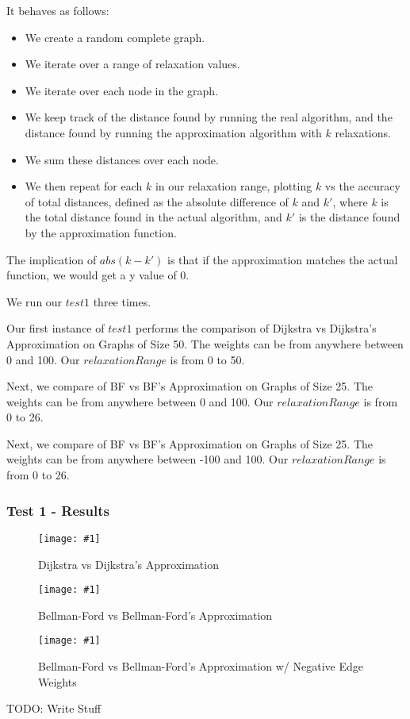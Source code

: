 \documentclass{article}
\newcommand{\figureInsetScaled}[3]
{
    \FloatBarrier{}
    \begin{figure}[ht!]
        \centering
        \texttt{[image: \#1]}
        \caption{#2}
    \end{figure}
    \FloatBarrier{}
}
\begin{document}
It behaves as follows:
\begin{itemize}
    \item We create a random complete graph.
    \item We iterate over a range of relaxation values.
    \item We iterate over each node in the graph.
    \item We keep track of the distance found by running the real algorithm, and the distance found by running the approximation algorithm with $k$ relaxations.
    \item We sum these distances over each node.
    \item We then repeat for each $k$ in our relaxation range, plotting $k$ vs the accuracy of total distances, defined as the absolute difference of $k$ and $k'$, where $k$ is the total distance found in the actual algorithm, and $k'$ is the distance found by the approximation function.
\end{itemize}

The implication of $abs(k - k')$ is that if the approximation matches the actual function, we would get a y value of 0.

We run our $test1$ three times.

Our first instance of $test1$ performs the comparison of Dijkstra vs Dijkstra's Approximation on Graphs of Size 50. The weights can be from anywhere between 0 and 100. Our $relaxationRange$ is from 0 to 50.

Next, we compare of BF vs BF's Approximation on Graphs of Size 25. The weights can be from anywhere between 0 and 100. Our $relaxationRange$ is from 0 to 26.

Next, we compare of BF vs BF's Approximation on Graphs of Size 25. The weights can be from anywhere between -100 and 100. Our $relaxationRange$ is from 0 to 26.

\subsubsection{Test 1 - Results}

\figureInsetScaled{images/part1/exp1_1a.png}{Dijkstra vs Dijkstra's Approximation}{0.5}
\figureInsetScaled{images/part1/exp1_1b.png}{Bellman-Ford vs Bellman-Ford's Approximation}{0.5}
\figureInsetScaled{images/part1/exp1_1c.png}{Bellman-Ford vs Bellman-Ford's Approximation w/ Negative Edge Weights}{0.5}

TODO: Write Stuff

\end{document}
